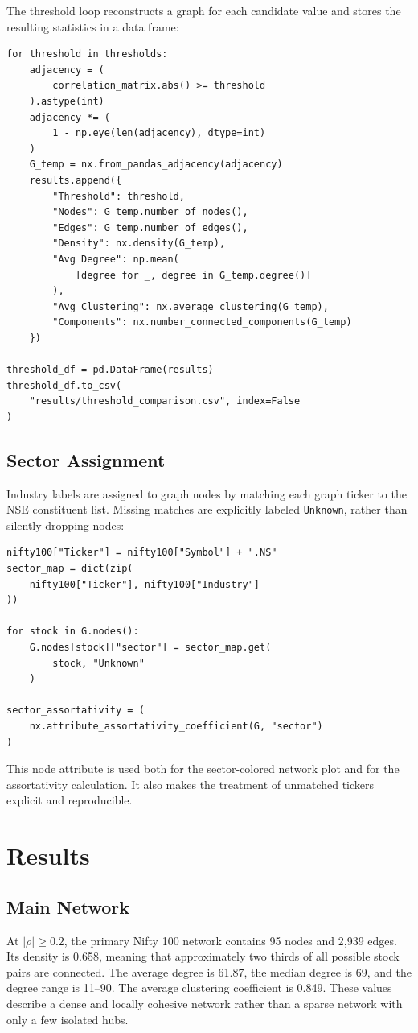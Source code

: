 \documentclass[12pt]{article}
\numberwithin{equation}{section}
\begin{document}
The threshold loop reconstructs a graph for each candidate value and stores
the resulting statistics in a data frame:

\begin{lstlisting}[caption={Comparing network properties across thresholds.}]
for threshold in thresholds:
    adjacency = (
        correlation_matrix.abs() >= threshold
    ).astype(int)
    adjacency *= (
        1 - np.eye(len(adjacency), dtype=int)
    )
    G_temp = nx.from_pandas_adjacency(adjacency)
    results.append({
        "Threshold": threshold,
        "Nodes": G_temp.number_of_nodes(),
        "Edges": G_temp.number_of_edges(),
        "Density": nx.density(G_temp),
        "Avg Degree": np.mean(
            [degree for _, degree in G_temp.degree()]
        ),
        "Avg Clustering": nx.average_clustering(G_temp),
        "Components": nx.number_connected_components(G_temp)
    })

threshold_df = pd.DataFrame(results)
threshold_df.to_csv(
    "results/threshold_comparison.csv", index=False
)
\end{lstlisting}

\subsection{Sector Assignment}
Industry labels are assigned to graph nodes by matching each graph ticker to
the NSE constituent list. Missing matches are explicitly labeled
\texttt{Unknown}, rather than silently dropping nodes:

\begin{lstlisting}[caption={Assigning sector attributes to graph nodes.}]
nifty100["Ticker"] = nifty100["Symbol"] + ".NS"
sector_map = dict(zip(
    nifty100["Ticker"], nifty100["Industry"]
))

for stock in G.nodes():
    G.nodes[stock]["sector"] = sector_map.get(
        stock, "Unknown"
    )

sector_assortativity = (
    nx.attribute_assortativity_coefficient(G, "sector")
)
\end{lstlisting}

This node attribute is used both for the sector-colored network plot and for
the assortativity calculation. It also makes the treatment of unmatched
tickers explicit and reproducible.

\section{Results}
\subsection{Main Network}
At $|\rho|\geq0.2$, the primary Nifty 100 network contains 95 nodes and 2,939
edges. Its density is 0.658, meaning that approximately two thirds of all
possible stock pairs are connected. The average degree is 61.87, the median
degree is 69, and the degree range is 11--90. The average clustering
coefficient is 0.849. These values describe a dense and locally cohesive
network rather than a sparse network with only a few isolated hubs.
\end{document}
